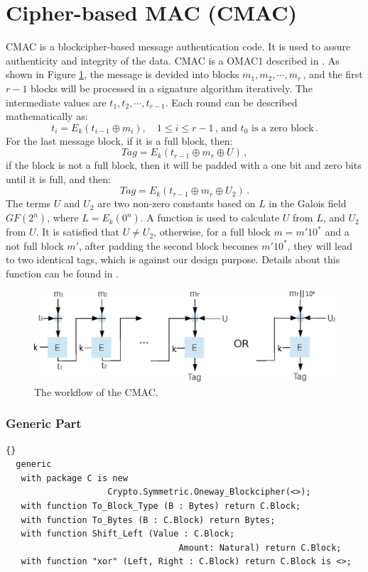 \section{Cipher-based MAC (CMAC)}
CMAC is a blockcipher-based message authentication code. It is used to
assure authenticity and integrity of the data.  CMAC is a OMAC1
described in \cite{DBLP:conf/fse/2003}. As shown in Figure \ref{OMAC},
the message is devided into blocks $m_1,m_2,\cdots,m_r$\,, and the
first $r-1$ blocks will be processed in a signature algorithm
iteratively. The intermediate values are $t_1,t_2,\cdots,
t_{r-1}$. Each round can be described mathematically as:
\begin{equation*}
t_i=E_k(t_{i-1}\oplus m_i), \quad 1\leq i \leq r-1\,,\,\mbox{and $t_0$ is a zero block}\,.
\end{equation*}
For the last message block, if it is a full block, then:
\begin{equation*}
Tag=E_k(t_{r-1}\oplus m_r \oplus U)\,,
\end{equation*}
if the block is not a full block, then it will be padded with a one bit and zero bits until it is full, and then:
\begin{equation*}
Tag=E_k(t_{r-1}\oplus m_r \oplus U_2)\,.
\end{equation*}
The terms $U$ and $U_2$ are two non-zero constants based on $L$ in the
Galois field $GF(2^n)$, where $L=E_k(0^n)$. A function is used to
calculate $U$ from $L$, and $U_2$ from $U$. It is satisfied that
$U\neq U_2$, otherwise, for a full block $m=m'10^*$ and a not full
block $m'$, after padding the second block becomes $m'10^*$, they will
lead to two identical tags, which is against our design purpose.
Details about this function can be found in \cite{DBLP:conf/fse/2003}.
\begin{figure}[h]
\centering
\includegraphics[scale=0.8]{./images/CMAC}
\caption{The workflow of the CMAC.}\label{OMAC}
\end{figure}


\subsubsection*{Generic Part}
\begin{lstlisting}{}
  generic
   with package C is new
   					Crypto.Symmetric.Oneway_Blockcipher(<>);
   with function To_Block_Type (B : Bytes) return C.Block;
   with function To_Bytes (B : C.Block) return Bytes;
   with function Shift_Left (Value : C.Block;
   								  Amount: Natural) return C.Block;
   with function "xor" (Left, Right : C.Block) return C.Block is <>;
\end{lstlisting}

